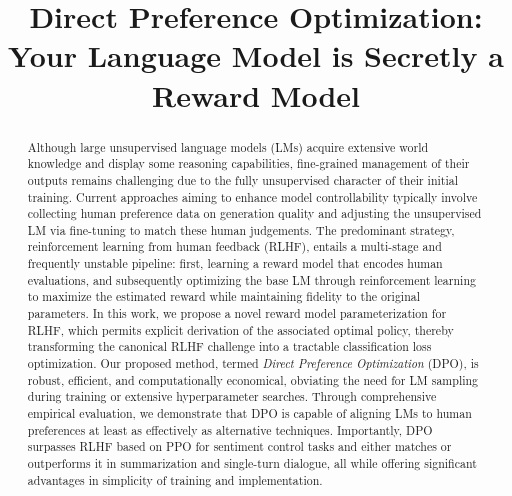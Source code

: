 \title{Direct Preference Optimization: Your Language Model is Secretly a Reward Model}

\begin{abstract}
Although large unsupervised language models (LMs) acquire extensive world knowledge and display some reasoning capabilities, fine-grained management of their outputs remains challenging due to the fully unsupervised character of their initial training. Current approaches aiming to enhance model controllability typically involve collecting human preference data on generation quality and adjusting the unsupervised LM via fine-tuning to match these human judgements. The predominant strategy, reinforcement learning from human feedback (RLHF), entails a multi-stage and frequently unstable pipeline: first, learning a reward model that encodes human evaluations, and subsequently optimizing the base LM through reinforcement learning to maximize the estimated reward while maintaining fidelity to the original parameters. In this work, we propose a novel reward model parameterization for RLHF, which permits explicit derivation of the associated optimal policy, thereby transforming the canonical RLHF challenge into a tractable classification loss optimization. Our proposed method, termed \textit{Direct Preference Optimization} (DPO), is robust, efficient, and computationally economical, obviating the need for LM sampling during training or extensive hyperparameter searches. Through comprehensive empirical evaluation, we demonstrate that DPO is capable of aligning LMs to human preferences at least as effectively as alternative techniques. Importantly, DPO surpasses RLHF based on PPO for sentiment control tasks and either matches or outperforms it in summarization and single-turn dialogue, all while offering significant advantages in simplicity of training and implementation.
\end{abstract}

